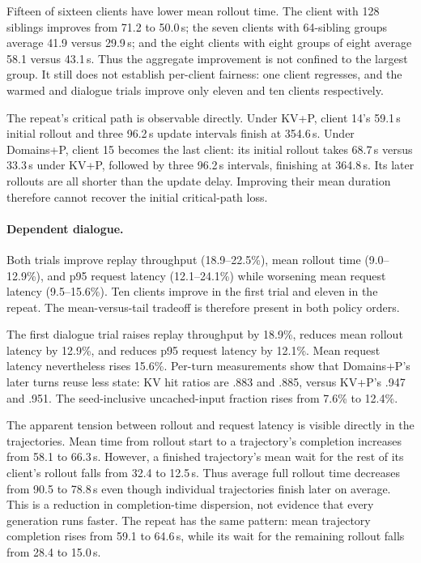 Fifteen of sixteen clients have lower mean rollout time. The client with 128
siblings improves from 71.2 to 50.0\,s; the seven clients with 64-sibling groups
average 41.9 versus 29.9\,s; and the eight clients with eight groups of eight
average 58.1 versus 43.1\,s. Thus the aggregate improvement is not confined to
the largest group. It still does not establish per-client fairness: one client
regresses, and the warmed and dialogue trials improve only eleven and ten
clients respectively.

The repeat's critical path is observable directly. Under KV+P, client 14's
59.1\,s initial rollout and three 96.2\,s update intervals finish at 354.6\,s.
Under Domains+P, client 15 becomes the last client: its initial rollout takes
68.7\,s versus 33.3\,s under KV+P, followed by three 96.2\,s intervals, finishing
at 364.8\,s. Its later rollouts are all shorter than the update delay. Improving
their mean duration therefore cannot recover the initial critical-path loss.

\paragraph{Dependent dialogue.}
Both trials improve replay throughput (18.9--22.5\%), mean rollout time
(9.0--12.9\%), and p95 request latency (12.1--24.1\%) while worsening mean
request latency (9.5--15.6\%). Ten clients improve in the first trial and eleven
in the repeat. The mean-versus-tail tradeoff is therefore present in both
policy orders.

The first dialogue trial raises replay throughput by 18.9\%, reduces mean
rollout latency by 12.9\%, and reduces p95 request latency by 12.1\%. Mean
request latency nevertheless rises 15.6\%. Per-turn measurements show that
Domains+P's later turns reuse less state: KV hit ratios are .883 and .885,
versus KV+P's .947 and .951. The seed-inclusive uncached-input fraction rises
from 7.6\% to 12.4\%.

The apparent tension between rollout and request latency is visible directly
in the trajectories. Mean time from rollout start to a trajectory's completion
increases from 58.1 to 66.3\,s. However, a finished trajectory's mean wait for
the rest of its client's rollout falls from 32.4 to 12.5\,s. Thus average full
rollout time decreases from 90.5 to 78.8\,s even though individual trajectories
finish later on average. This is a reduction in completion-time dispersion,
not evidence that every generation runs faster.
The repeat has the same pattern: mean trajectory completion rises from 59.1
to 64.6\,s, while its wait for the remaining rollout falls from 28.4 to 15.0\,s.

